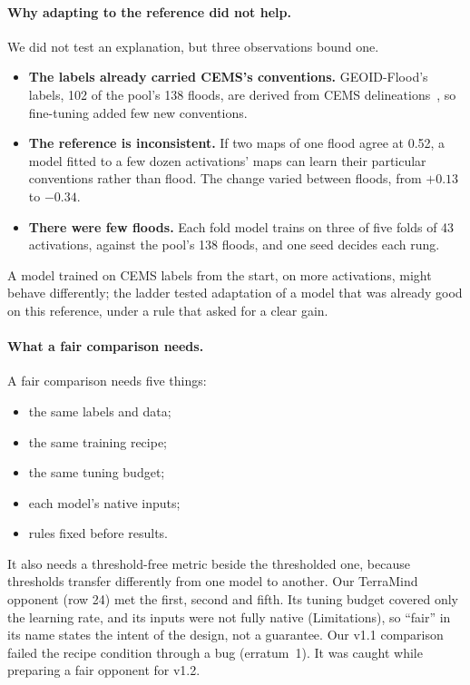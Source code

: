 \documentclass[10pt,twocolumn,a4paper]{article}
\begin{document}
\paragraph{Why adapting to the reference did not help.} We did not test an explanation, but three observations bound
one.
\begin{itemize}
  \item \textbf{The labels already carried CEMS's conventions.} GEOID-Flood's labels, 102 of the pool's 138 floods,
    are derived from CEMS delineations~\citep{chiriaco2026geoid}, so fine-tuning added few new conventions.
  \item \textbf{The reference is inconsistent.} If two maps of one flood agree at 0.52, a model fitted to a few dozen
    activations' maps can learn their particular conventions rather than flood. The change varied between floods,
    from $+0.13$ to $-0.34$.
  \item \textbf{There were few floods.} Each fold model trains on three of five folds of 43 activations, against the
    pool's 138 floods, and one seed decides each rung.
\end{itemize}
A model trained on CEMS labels from the start, on more activations, might behave differently; the ladder tested
adaptation of a model that was already good on this reference, under a rule that asked for a clear gain.

\paragraph{What a fair comparison needs.} A fair comparison needs five things:
\begin{itemize}
  \item the same labels and data;
  \item the same training recipe;
  \item the same tuning budget;
  \item each model's native inputs;
  \item rules fixed before results.
\end{itemize}
It also needs a threshold-free metric beside the thresholded one, because thresholds transfer differently from one
model to another. Our TerraMind opponent (row 24) met the first, second and fifth. Its tuning budget covered only
the learning rate, and its inputs were not fully native (Limitations), so ``fair'' in its name states the intent of
the design, not a guarantee. Our v1.1 comparison failed the recipe condition through a bug (erratum~1). It was caught while
preparing a fair opponent for v1.2.
\end{document}
